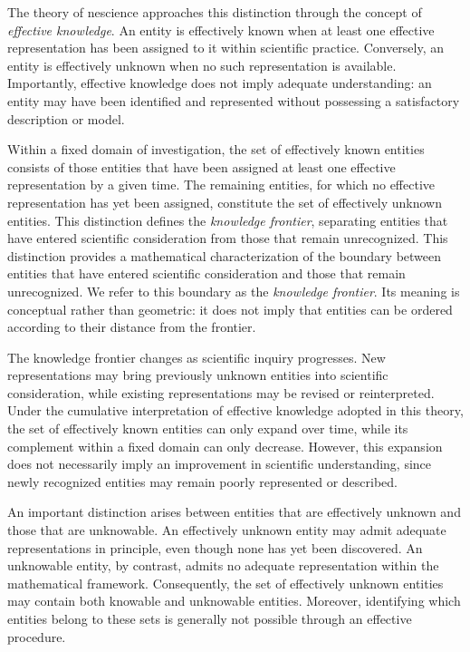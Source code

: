 The theory of nescience approaches this distinction through the concept of \emph{effective knowledge}. An entity is effectively known when at least one effective representation has been assigned to it within scientific practice. Conversely, an entity is effectively unknown when no such representation is available. Importantly, effective knowledge does not imply adequate understanding: an entity may have been identified and represented without possessing a satisfactory description or model.

Within a fixed domain of investigation, the set of effectively known entities consists of those entities that have been assigned at least one effective representation by a given time. The remaining entities, for which no effective representation has yet been assigned, constitute the set of effectively unknown entities. This distinction defines the \emph{knowledge frontier}, separating entities that have entered scientific consideration from those that remain unrecognized. This distinction provides a mathematical characterization of the boundary between entities that have entered scientific consideration and those that remain unrecognized. We refer to this boundary as the \emph{knowledge frontier}. Its meaning is conceptual rather than geometric: it does not imply that entities can be ordered according to their distance from the frontier.

The knowledge frontier changes as scientific inquiry progresses. New representations may bring previously unknown entities into scientific consideration, while existing representations may be revised or reinterpreted. Under the cumulative interpretation of effective knowledge adopted in this theory, the set of effectively known entities can only expand over time, while its complement within a fixed domain can only decrease. However, this expansion does not necessarily imply an improvement in scientific understanding, since newly recognized entities may remain poorly represented or described.

An important distinction arises between entities that are effectively unknown and those that are unknowable. An effectively unknown entity may admit adequate representations in principle, even though none has yet been discovered. An unknowable entity, by contrast, admits no adequate representation within the mathematical framework. Consequently, the set of effectively unknown entities may contain both knowable and unknowable entities. Moreover, identifying which entities belong to these sets is generally not possible through an effective procedure.

